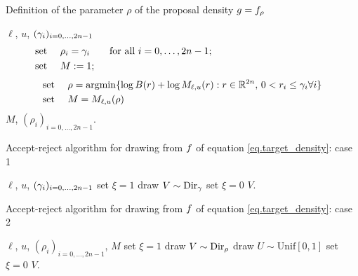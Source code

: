 \documentclass[10pt, article,table]{article}
\begin{document}
\begin{algorithm}[h]
 \caption{Definition of the parameter $\rho$ of the proposal density $\proposalDensity = \dirichletDensity[\rho]$}
 \label{algo.set_proposal_param}
 \begin{algorithmic}
  \REQUIRE $\ell$, $u$, $(\dirparam_i)_{i=0,\dots,2n-1}$ 
  \STATE \begin{equation*}
  \begin{split}
  &\text{set } \quad \rho_i = \dirparam_i \qquad \text{for all } i=0,\dots,2n-1;
  \qquad\qquad\qquad\qquad\qquad\qquad
  \\
  &\text{set } \quad M:=1;
 \end{split}  
  \end{equation*}
  \ELSE
  \STATE 
   \begin{equation*}
   \begin{split}
  &\text{set } \quad \rho = \argmin\lbrace \log B(r) + \log M\subscriptellu(r): r \in \R^{2n}, \, 0<r_i\leq \dirparam_i \forall i \rbrace
  \\
  &
  \text{set } \quad M =  M\subscriptellu(\rho)
  \end{split}
  \end{equation*}
  \ENDIF
  \RETURN $M$, $(\rho_i)_{i=0,\dots,2n-1}$.
 \end{algorithmic}
\end{algorithm}

\begin{algorithm}[h!]
 \caption{Accept-reject algorithm for drawing from $\targetDensity$ of equation \eqref{eq.target_density}: case 1}
 \label{algo.rejection_sampling_1}
 \begin{algorithmic}[5]
  \REQUIRE $\ell$, $u$, $(\dirparam_i)_{i=0,\dots,2n-1}$
  \STATE set $\xi = 1$
  \STATE draw $V\sim\dirichlet[\dirparam]$
  \STATE set $\xi=0$
  \ENDIF
  \ENDWHILE
  \RETURN $V$.
 \end{algorithmic}
\end{algorithm}



\begin{algorithm}[h!]
 \caption{Accept-reject algorithm for drawing from $\targetDensity$ of equation \eqref{eq.target_density}: case 2}
 \label{algo.rejection_sampling_2}
 \begin{algorithmic}[5]
  \REQUIRE $\ell$, $u$,  $(\rho_i)_{i=0,\dots,2n-1}$, $M$
  \STATE set $\xi = 1$
  \STATE draw $V\sim\dirichlet[\rho]$
  \STATE draw $U\sim \text{Unif}[0,1]$
  \STATE set $\xi = 0$
  \ENDIF
  \ENDIF
  \ENDWHILE
  \RETURN $V$.
 \end{algorithmic}
\end{algorithm}
\end{document}
